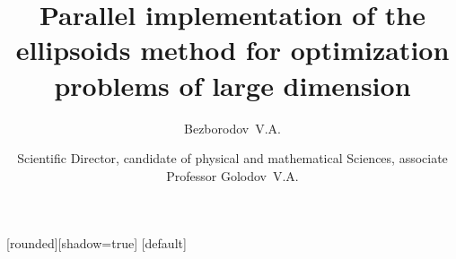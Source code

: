 

[rounded][shadow=true]
[default]


\newenvironment{titleblock}{
  \setbeamertemplate{blocks}[rounded][shadow=false]
  \begin{exampleblock}{}\centering\Large}{\end{exampleblock}}
  

\usepackage{pscyr}
\usepackage[cp1251]{inputenc}
\usepackage[russian]{babel}
\usepackage[T2A]{fontenc}
\usepackage{amsmath}
\usepackage{amsfonts}
\usepackage{amssymb}

\usepackage{hyperref}
\hypersetup{unicode=true}

\newtheorem{rustheorem}{Theorem}
\newtheorem{ruscorollary}{Corollary}


\newcommand{\figpath}[1]{../../Paper/Figures/#1}


\author[Bezborodov~V.A., CMI, EMMaS]{Bezborodov~V.A. \and {\footnotesize Scientific Director, candidate of physical and mathematical Sciences, associate Professor Golodov~V.A.}}

\title[Parallel implementation of the EM]{Parallel implementation of the ellipsoids method for optimization problems of large dimension}

\date[SUSU, Chelyabinsk, 2016]{}